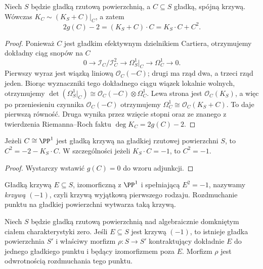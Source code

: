 \begin{twierdzenie}
\label{tw:ga6-adjunction}
Niech $S$ będzie gładką rzutową powierzchnią, a
$C\subseteq S$ gładką, spójną krzywą. Wówczas
$K_C\sim (K_S+C)|_C$, a zatem
\[
 2g(C)-2=(K_S+C)\cdot C=K_S\cdot C+C^2.
\]
\end{twierdzenie}
\begin{proof}
Ponieważ $C$ jest gładkim efektywnym dzielnikiem
Cartiera, otrzymujemy dokładny ciąg snopów na $C$
\[
0\longrightarrow\mathcal I_C/\mathcal I_C^2
 \longrightarrow\Omega^1_S|_C\longrightarrow\Omega^1_C
 \longrightarrow0.
\]
Pierwszy wyraz jest wiązką liniową
$\mathcal O_C(-C)$; drugi ma rząd dwa, a trzeci
rząd jeden. Biorąc wyznaczniki tego dokładnego
ciągu wiązek lokalnie wolnych, otrzymujemy
$\det(\Omega^1_S|_C)\cong
 \mathcal O_C(-C)\otimes\Omega^1_C$.
Lewa strona jest $\mathcal O_C(K_S)$,
a więc po przeniesieniu czynnika
$\mathcal O_C(-C)$ otrzymujemy
$\Omega_C^1\cong\mathcal O_C(K_S+C)$.
To daje pierwszą równość. Druga wynika przez
wzięcie stopni oraz ze znanego z twierdzenia
Riemanna--Roch faktu $\deg K_C=2g(C)-2$.
\end{proof}

\begin{wniosek}
\label{wn:ga6-rational-adjunction}
Jeżeli $C\cong\PP^1$ jest gładką krzywą na gładkiej
rzutowej powierzchni $S$, to
$C^2=-2-K_S\cdot C$.
W szczególności jeżeli $K_S\cdot C=-1$, to $C^2=-1$.
\end{wniosek}
\begin{proof}
Wystarczy wstawić $g(C)=0$ do wzoru adjunkcji.
\end{proof}

\begin{definicja}
Gładką krzywą $E\subseteq S$, izomorficzną z
$\PP^1$ i spełniającą $E^2=-1$, nazywamy
\emph{krzywą $(-1)$}, czyli krzywą wyjątkową
pierwszego rodzaju. Rozdmuchanie punktu na gładkiej
powierzchni wytwarza taką krzywą.
\end{definicja}

\begin{twierdzenie}
\label{tw:ga6-castelnuovo}
Niech $S$ będzie gładką rzutową powierzchnią nad
algebraicznie domkniętym ciałem charakterystyki zero.
Jeśli $E\subseteq S$ jest krzywą $(-1)$, to istnieje
gładka powierzchnia $S'$ i właściwy morfizm
$\rho:S\to S'$ kontraktujący dokładnie $E$ do jednego
gładkiego punktu i będący izomorfizmem poza $E$.
Morfizm $\rho$ jest odwrotnością rozdmuchania tego punktu.
\end{twierdzenie}

